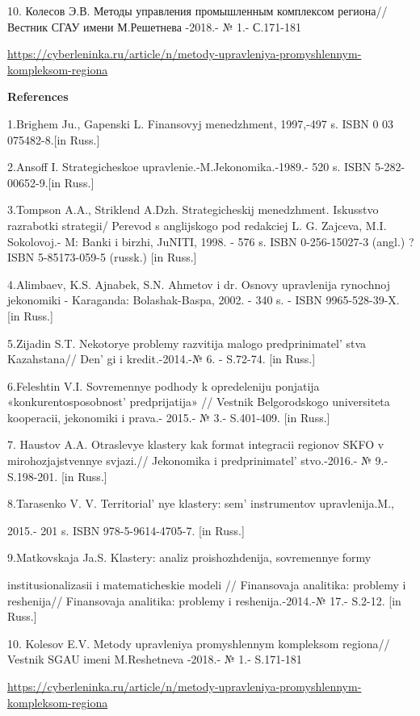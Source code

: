 10. Колесов Э.В. Методы управления промышленным комплексом региона//
Вестник СГАУ имени М.Решетнева -2018.- № 1.- С.171-181

\url{https://cyberleninka.ru/article/n/metody-upravleniya-promyshlennym-kompleksom-regiona}

{\bfseries References}

1.Brighem Ju., Gapenski L. Finansovyj menedzhment, 1997,-497 s. ISBN 0
03 075482-8.{[}in Russ.{]}

2.Ansoff I. Strategicheskoe upravlenie.-M.Jekonomika.-1989.- 520 s. ISBN
5-282-00652-9.{[}in Russ.{]}

3.Tompson A.A., Striklend A.Dzh. Strategicheskij menedzhment. Iskusstvo
razrabotki strategii/ Perevod s anglijskogo pod redakciej L. G. Zajceva,
M.I. Sokolovoj.- M: Banki i birzhi, JuNITI, 1998. - 576 s. ISBN
0-256-15027-3 (angl.) ?ISBN 5-85173-059-5 (russk.) {[}in Russ.{]}

4.Alimbaev, K.S. Ajnabek, S.N. Ahmetov i dr. Osnovy upravlenija
rynochnoj jekonomiki - Karaganda: Bolashak-Baspa, 2002. - 340 s. - ISBN
9965-528-39-X. {[}in Russ.{]}

5.Zijadin S.T. Nekotorye problemy razvitija malogo
predprinimatel' stva Kazahstana// Den' gi
i kredit.-2014.-№ 6. - S.72-74. {[}in Russ.{]}

6.Feleshtin V.I. Sovremennye podhody k opredeleniju ponjatija
«konkurentosposobnost'{} predprijatija» // Vestnik
Belgorodskogo universiteta kooperacii, jekonomiki i prava.- 2015.- № 3.-
S.401-409. {[}in Russ.{]}

7. Haustov A.A. Otraslevye klastery kak format integracii regionov SKFO
v mirohozjajstvennye svjazi.// Jekonomika i
predprinimatel' stvo.-2016.- № 9.- S.198-201. {[}in
Russ.{]}

8.Tarasenko V. V. Territorial' nye klastery:
sem'{} instrumentov upravlenija.M.,

2015.- 201 s. ISBN 978-5-9614-4705-7. {[}in Russ.{]}

9.Matkovskaja Ja.S. Klastery: analiz proishozhdenija, sovremennye formy

institusionalizasii i matematicheskie modeli // Finansovaja analitika:
problemy i reshenija// Finansovaja analitika: problemy i
reshenija.-2014.-№ 17.- S.2-12. {[}in Russ.{]}

10. Kolesov E.V. Metody upravleniya promyshlennym kompleksom regiona//
Vestnik SGAU imeni M.Reshetneva -2018.- № 1.- S.171-181

\url{https://cyberleninka.ru/article/n/metody-upravleniya-promyshlennym-kompleksom-regiona}

